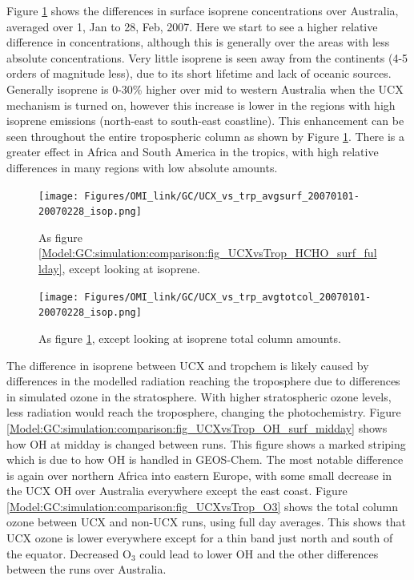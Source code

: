       Figure \ref{Model:GC:simulation:comparison:fig_UCXvsTrop_isop_surf_fullday} shows the differences in surface isoprene concentrations over Australia, averaged over 1, Jan to 28, Feb, 2007.
      Here we start to see a higher relative difference in concentrations, although this is generally over the areas with less absolute concentrations. 
      Very little isoprene is seen away from the continents (4-5 orders of magnitude less), due to its short lifetime and  lack of oceanic sources.
      Generally isoprene is 0-30\% higher over mid to western Australia when the UCX mechanism is turned on, however this increase is lower in the regions with high isoprene emissions (north-east to south-east coastline).
      This enhancement can be seen throughout the entire tropospheric column as shown by Figure \ref{Model:GC:simulation:comparison:fig_UCXvsTrop_isop_surf_fullday}.
      There is a greater effect in Africa and South America in the tropics, with high relative differences in many regions with low absolute amounts.
      
      \begin{figure}
        \texttt{[image: Figures/OMI\_link/GC/UCX\_vs\_trp\_avgsurf\_20070101-20070228\_isop.png]}
        \caption{ %
          As figure \ref{Model:GC:simulation:comparison:fig_UCXvsTrop_HCHO_surf_fullday}, except looking at isoprene. 
        }      
        \label{Model:GC:simulation:comparison:fig_UCXvsTrop_isop_surf_fullday}
      \end{figure}
      \begin{figure}
        \texttt{[image: Figures/OMI\_link/GC/UCX\_vs\_trp\_avgtotcol\_20070101-20070228\_isop.png]}
        \caption{ %
          As figure \ref{Model:GC:simulation:comparison:fig_UCXvsTrop_isop_surf_fullday}, except looking at isoprene total column amounts. 
        }      
        \label{Model:GC:simulation:comparison:fig_UCXvsTrop_isop_totcol_fullday}
      \end{figure}
      
      
      The difference in isoprene between UCX and tropchem is likely caused by differences in the modelled radiation reaching the troposphere due to differences in simulated ozone in the stratosphere.
      With higher stratospheric ozone levels, less radiation would reach the troposphere, changing the photochemistry.
      Figure \ref{Model:GC:simulation:comparison:fig_UCXvsTrop_OH_surf_midday} shows how OH at midday is changed between runs.
      This figure shows a marked striping which is due to how OH is handled in GEOS-Chem.
      The most notable difference is again over northern Africa into eastern Europe, with some small decrease in the UCX OH over Australia everywhere except the east coast.
      Figure \ref{Model:GC:simulation:comparison:fig_UCXvsTrop_O3} shows the total column ozone between UCX and non-UCX runs, using full day averages.
      This shows that UCX ozone is lower everywhere except for a thin band just north and south of the equator.
      Decreased O$_3$ could lead to lower OH and the other differences between the runs over Australia.
      

